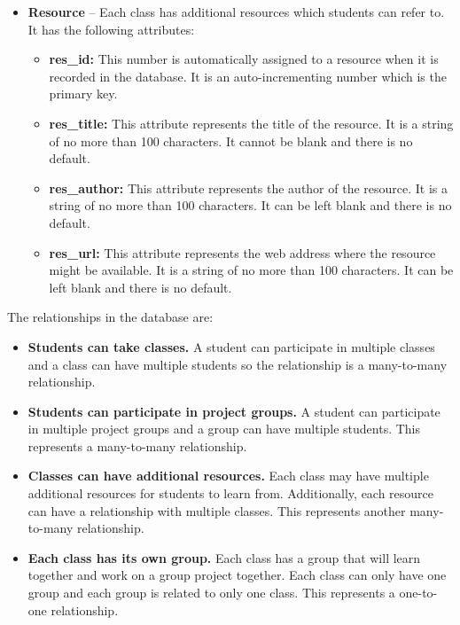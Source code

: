 \documentclass[12pt]{article}
\begin{document}
\begin{itemize}
	\item \textbf{Resource} -- Each class has additional resources which students can refer to. It has the following attributes:
	\begin{itemize}
		\item \textbf{res\_id:} This number is automatically assigned to a resource when it is recorded in the database. It is an auto-incrementing number which is the primary key.
		\item \textbf{res\_title:} This attribute represents the title of the resource. It is a string of no more than 100 characters. It cannot be blank and there is no default. 
		\item \textbf{res\_author:} This attribute represents the author of the resource. It is a string of no more than 100 characters. It can be left blank and there is no default. 
		\item \textbf{res\_url:} This attribute represents the web address where the resource might be available. It is a string of no more than 100 characters. It can be left blank and there is no default. 
	\end{itemize}
\end{itemize}

The relationships in the database are:
\begin{itemize}
	\item \textbf{Students can take classes.} A student can participate in multiple classes and a class can have multiple students so the relationship is a many-to-many relationship.
	\item \textbf{Students can participate in project groups.} A student can participate in multiple project groups and a group can have multiple students. This represents  a many-to-many relationship.
	\item \textbf{Classes can have additional resources.} Each class may have multiple additional resources for students to learn from. Additionally, each resource can have a relationship with multiple classes. This represents another many-to-many relationship.
	\item \textbf{Each class has its own group.} Each class has a group that will learn together and work on a group project together. Each class can only have one group and each group is related to only one class. This represents a one-to-one relationship.

\end{itemize}


\end{document}
